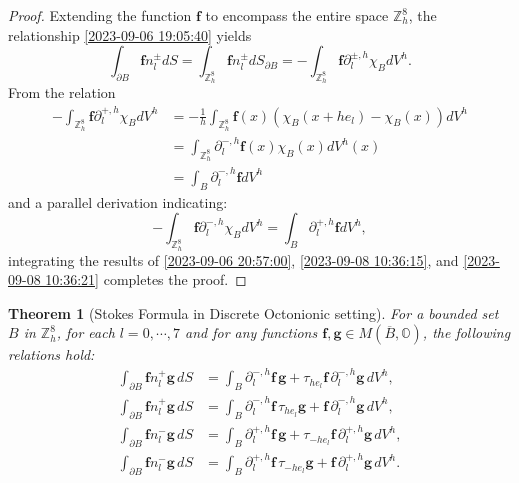 \documentclass{amsart}
\newtheorem{theorem}{Theorem}[section]
\theoremstyle{definition}
\theoremstyle{remark}
\numberwithin{equation}{section}
\newcommand{\p}{\partial}
\newcommand{\OO}{\mathbb O}
\newcommand{\Z}{\mathbb Z}
\newcommand{\f}{\bm{f}}
\newcommand{\g}{\bm{g}}
\begin{document}
\begin{proof}
	Extending the function $\f$ to encompass the entire space $\Z^8_h$, the relationship \eqref{2023-09-06 19:05:40} yields
	\begin{equation}
		\label{2023-09-06 20:57:00}
		\int_{\p B} \f n_l^{\pm}dS = \int_{\Z^8_h} \f n_l^{\pm}dS_{\p B} = -\int_{\Z^8_h} \f \p_l^{\pm,h} \chi_B dV^h.
	\end{equation}
	From the relation
	\begin{equation}\label{2023-09-08 10:36:15}
		\begin{aligned}
			-\int_{\Z^8_h} \f \p_l^{+,h} \chi_B dV^h &= -\frac{1}{h}\int_{\Z^8_h} \f(x)(\chi_B(x+he_l)-\chi_B(x))dV^h\\
			&= \int_{\Z^8_h} \p_l^{-,h} \f(x) \chi_B(x) dV^h(x)\\
			&= \int_B \p_l^{-,h} \f dV^h
		\end{aligned}
	\end{equation}
	and a parallel derivation indicating:
	\begin{equation}\label{2023-09-08 10:36:21}
		-\int_{\Z^8_h} \f \p_l^{-,h} \chi_B dV^h = \int_B \p_l^{+,h} \f dV^h,
	\end{equation}
	integrating the results of \eqref{2023-09-06 20:57:00}, \eqref{2023-09-08 10:36:15}, and \eqref{2023-09-08 10:36:21} completes the proof.
\end{proof}










\begin{theorem}[Stokes Formula in Discrete Octonionic setting]
	For a bounded set $B$ in $\Z^8_h$, for each $l=0,\cdots,7$ and for any functions $\f,\g \in M(\overline B, \OO)$, the following relations hold:
	\begin{equation}
		\label{2023-09-06 19:08:17}
		\begin{aligned}
			\int_{\p B} \f n_l^+ \g \, dS &= \int_B \p_l^{-,h}\f \, \g + \tau_{he_l}\f \, \p_l^{-,h}\g \, dV^h,\\
			\int_{\p B} \f n_l^+ \g \, dS &= \int_B \p_l^{-,h}\f \, \tau_{he_l}\g + \f \, \p_l^{-,h}\g \, dV^h,\\
			\int_{\p B} \f n_l^- \g \, dS &= \int_B \p_l^{+,h}\f \, \g + \tau_{-he_l}\f \, \p_l^{+,h}\g \, dV^h,\\
			\int_{\p B} \f n_l^- \g \, dS &= \int_B \p_l^{+,h}\f \, \tau_{-he_l}\g + \f \, \p_l^{+,h}\g \, dV^h.
		\end{aligned}
	\end{equation}
\end{theorem}
\end{document}

